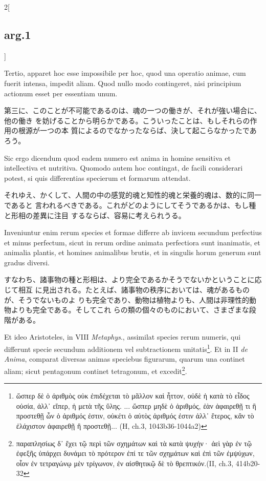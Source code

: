 \documentclass[paper=a4paper,fontsize=10pt,jafontsize=9pt,titlepage]{jlreq}
\begin{document}
\begin{paracol}{2}[\subsection{arg.1}]
\switchcolumn*

Tertio, apparet hoc esse impossibile per hoc, quod una operatio animae, cum
fuerit intensa, impedit aliam. Quod nullo modo contingeret, nisi principium
actionum esset per essentiam unum.

\switchcolumn

第三に、このことが不可能であるのは、魂の一つの働きが、それが強い場合に、他の働き
を妨げることから明らかである。こういったことは、もしそれらの作用の根源が一つの本
質によるのでなかったならば、決して起こらなかったであろう。
 
\switchcolumn*

 Sic ergo dicendum quod eadem numero est anima in homine sensitiva et
 intellectiva et nutritiva. Quomodo autem hoc contingat, de facili considerari
 potest, si quis differentias specierum et formarum attendat.

 \switchcolumn

それゆえ、かくして、人間の中の感覚的魂と知性的魂と栄養的魂は、数的に同一であると
言われるべきである。これがどのようにしてそうであるかは、もし種と形相の差異に注目
するならば、容易に考えられうる。
 
\switchcolumn*

 Inveniuntur enim rerum species et formae differre ab invicem secundum
 perfectius et minus perfectum, sicut in rerum ordine animata perfectiora sunt
 inanimatis, et animalia plantis, et homines animalibus brutis, et in singulis
 horum generum sunt gradus diversi.

\switchcolumn

すなわち、諸事物の種と形相は、より完全であるかそうでないかということに応じて相互
に見出される。たとえば、諸事物の秩序においては、魂があるものが、そうでないものよ
りも完全であり、動物は植物よりも、人間は非理性的動物よりも完全である。そしてこれ
らの類の個々のものにおいて、さまざまな段階がある。
 
\switchcolumn*

Et ideo Aristoteles, in VIII {\itshape Metaphys}., assimilat species rerum
numeris, qui differunt specie secundum additionem vel subtractionem
unitatis\footnote{ὥσπερ δὲ ὁ ἀριθμὸς οὐκ ἐπιδέχεται τὸ μᾶλλον καὶ ἧττον, οὐδὲ ἡ
  κατὰ τὸ εἶδος οὐσία, ἀλλ᾽ εἴπερ, ἡ μετὰ τῆς ὕλης. ... ὥσπερ μηδὲ ὁ ἀριθμός,
  ἐὰν ἀφαιρεθῇ τι ἢ προστεθῇ ὧν ὁ ἀριθμός ἐστιν, οὐκέτι ὁ αὐτὸς ἀριθμός ἐστιν
  ἀλλ᾽ ἕτερος, κἂν τὸ ἐλάχιστον ἀφαιρεθῇ ἢ προστεθῇ... (H, ch.3,
  1043b36-1044a2)}. Et in II {\itshape de Anima}, comparat diversas animas
speciebus figurarum, quarum una continet aliam; sicut pentagonum continet
tetragonum, et excedit\footnote{παραπλησίως δ᾽ ἔχει τῷ περὶ τῶν σχημάτων καὶ τὰ
  κατὰ ψυχήν· ἀεὶ γὰρ ἐν τῷ ἐφεξῆς ὑπάρχει δυνάμει τὸ πρότερον ἐπί τε τῶν
  σχημάτων καὶ ἐπὶ τῶν ἐμψύχων, οἷον ἐν τετραγώνῳ μὲν τρίγωνον, ἐν αἰσθητικῷ δὲ
  τὸ θρεπτικόν.(II, ch.3, 414b20-32}.


\end{paracol}
\end{document}
